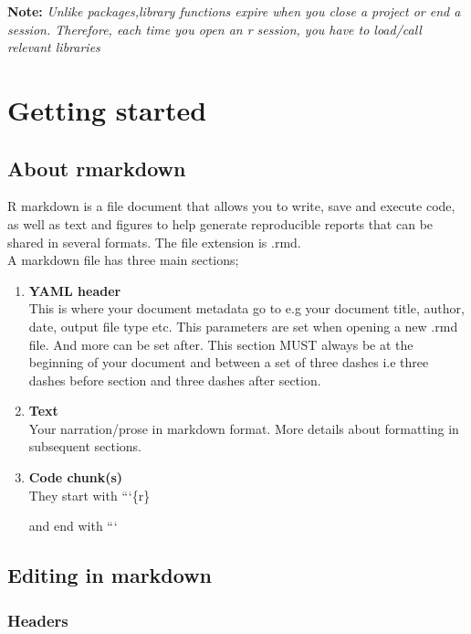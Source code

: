 \documentclass[
]{book}
\begin{document}
\textbf{Note:} \emph{Unlike packages,library functions expire when you close a project or end a session. Therefore, each time you open an r session, you have to load/call relevant libraries}

\hypertarget{getting-started}{%
\chapter{Getting started}\label{getting-started}}

\hypertarget{about-rmarkdown}{%
\section{About rmarkdown}\label{about-rmarkdown}}

R markdown is a file document that allows you to write, save and execute code, as well as text and figures to help generate reproducible reports that can be shared in several formats.
The file extension is .rmd.\\
A markdown file has three main sections;

\begin{enumerate}
\def\labelenumi{\arabic{enumi}.}
\item
  \textbf{YAML header}\\
  This is where your document metadata go to e.g your document title, author, date, output file type etc.
  This parameters are set when opening a new .rmd file. And more can be set after.
  This section MUST always be at the beginning of your document and between a set of three dashes i.e three dashes before section and three dashes after section.
\item
  \textbf{Text}\\
  Your narration/prose in markdown format. More details about formatting in subsequent sections.
\item
  \textbf{Code chunk(s)}\\
  They start with ```\{r\}

  and end with ```
\end{enumerate}

\hypertarget{editing-in-markdown}{%
\section{Editing in markdown}\label{editing-in-markdown}}

\hypertarget{headers}{%
\subsection{Headers}\label{headers}}
\end{document}
